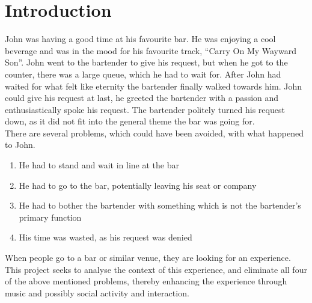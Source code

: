 \chapter{Introduction}\label{introduction}
John was having a good time at his favourite bar. He was enjoying a cool beverage and was in the mood for his favourite track, \enquote{Carry On My Wayward Son}. John went to the bartender to give his request, but when he got to the counter, there was a large queue, which he had to wait for. After John had waited for what felt like eternity the bartender finally walked towards him. John could give his request at last, he greeted the bartender with a passion and enthusiastically spoke his request. The bartender politely turned his request down, as it did not fit into the general theme the bar was going for.\\

There are several problems, which could have been avoided, with what happened to John.
\begin{enumerate}
	\item He had to stand and wait in line at the bar
	\item He had to go to the bar, potentially leaving his seat or company
	\item He had to bother the bartender with something which is not the bartender's primary function
	\item His time was wasted, as his request was denied
\end{enumerate}

When people go to a bar or similar venue, they are looking for an experience.
This project seeks to analyse the context of this experience, and eliminate all four of the above mentioned problems, thereby enhancing the experience through music and possibly social activity and interaction.
